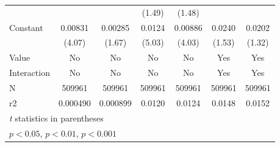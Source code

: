 {\begin{tabular}{l*{6}{c}}
                    &                     &                     &      (1.49)         &      (1.48)         &                     &                     \\
[1em]
Constant            &     0.00831\sym{***}&     0.00285         &      0.0124\sym{***}&     0.00886\sym{***}&      0.0240         &      0.0202         \\
                    &      (4.07)         &      (1.67)         &      (5.03)         &      (4.03)         &      (1.53)         &      (1.32)         \\
\hline
Value               &          No         &          No         &          No         &          No         &         Yes         &         Yes         \\
Interaction         &          No         &          No         &          No         &          No         &         Yes         &         Yes         \\
N                   &      509961         &      509961         &      509961         &      509961         &      509961         &      509961         \\
r2                  &    0.000490         &    0.000899         &      0.0120         &      0.0124         &      0.0148         &      0.0152         \\
\hline\hline
\multicolumn{7}{l}{\footnotesize \textit{t} statistics in parentheses}\\
\multicolumn{7}{l}{\footnotesize \sym{*} \(p<0.05\), \sym{**} \(p<0.01\), \sym{***} \(p<0.001\)}\\
\end{tabular}
}
